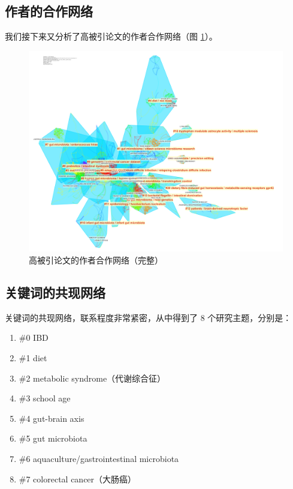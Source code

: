 \documentclass[]{ctexbook}
\providecommand{\tightlist}{%
  \setlength{\itemsep}{0pt}\setlength{\parskip}{0pt}}
\begin{document}
\hypertarget{ux4f5cux8005ux7684ux5408ux4f5cux7f51ux7edc}{%
\subsection{作者的合作网络}\label{ux4f5cux8005ux7684ux5408ux4f5cux7f51ux7edc}}

我们接下来又分析了高被引论文的作者合作网络（图 \ref{fig:citespace-highlycited-author-network-complete}）。

\begin{figure}
\includegraphics[width=1\linewidth]{citespace/citespace-highlycited-author-network-complete} \caption{高被引论文的作者合作网络（完整）}\label{fig:citespace-highlycited-author-network-complete}
\end{figure}

\hypertarget{ux5173ux952eux8bcdux7684ux5171ux73b0ux7f51ux7edc}{%
\subsection{关键词的共现网络}\label{ux5173ux952eux8bcdux7684ux5171ux73b0ux7f51ux7edc}}

关键词的共现网络，联系程度非常紧密，从中得到了 8 个研究主题，分别是：

\begin{enumerate}
\def\labelenumi{\arabic{enumi}.}
\tightlist
\item
  \#0 IBD
\item
  \#1 diet
\item
  \#2 metabolic syndrome（代谢综合征）
\item
  \#3 school age
\item
  \#4 gut-brain axis
\item
  \#5 gut microbiota
\item
  \#6 aquaculture/gastrointestinal microbiota
\item
  \#7 colorectal cancer（大肠癌）
\end{enumerate}
\end{document}

